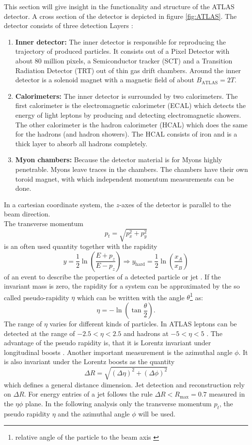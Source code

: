 \documentclass[11pt,a4paper,notitlepage]{scrartcl}
\begin{document}
This section will give insight in the functionality and structure of the ATLAS detector. A cross section of the detector is depicted in figure \ref{fig:ATLAS}. The detector consists of three detection Layers \cite{manual}:
\begin{enumerate}
	\item \textbf{Inner detector:} The inner detector is responsible for reproducing the trajectory of produced particles. It consists out of a Pixel Detector with about 80 million pixels, a Semiconductor tracker (SCT) and a Transition Radiation Detector (TRT) out of thin gas drift chambers. Around the inner detector is a solenoid magnet with a magnetic field of about $B_{\text{ATLAS}}=2T$.  
	\item \textbf{Calorimeters:} The inner detector is surrounded by two calorimeters. The first calorimeter is the electromagnetic calorimeter (ECAL) which detects the energy of light leptons by producing and detecting electromagnetic showers. The other calorimeter is the hadron calorimeter (HCAL) which does the same for the hadrons (and hadron showers). The HCAL consists of iron and is a thick layer to absorb all hadrons completely.
	\item \textbf{Myon chambers:} Because the detector material is for Myons highly penetrable. Myons leave traces in the chambers. The chambers have their own toroid magnet, with which independent momentum measurements can be done.
\end{enumerate}
In a cartesian coordinate system, the $z$-axes of the detector is parallel to the beam direction.\\
The transverse momentum 
\begin{equation*}
	p_t=\sqrt{p_x^2+p_y^2}
\end{equation*}
 is an often used quantity together with the rapidity 
$$y=\frac{1}{2}\ln\left({\frac{E+p_z}{E-p_z}}\right)\Rightarrow y_{\text{hard}}=\frac{1}{2}\ln\left({\frac{x_A}{x_B}}\right)$$
of an event to describe the properties of a detected particle or jet \cite{manual}.
If the invariant mass is zero, the rapidity for a system can be approximated by the so called pseudo-rapidity $\eta$ which can be written with the angle $\theta$\footnote{relative angle of the particle to the beam axis \cite{theta}} as:
$$\eta=-\ln\left(\tan\frac{\theta}{2}\right).$$
The range of $\eta$ varies for different kinds of particles. In ATLAS leptons can be detected at the range of $-2.5<\eta<2.5$ and hadrons at $-5<\eta< 5$ \cite{manual}. The advantage of the pseudo rapidity is, that it is  Lorentz invariant under longitudinal boosts \cite{theta}. Another important measurement is the azimuthal angle $\phi$. It is also invariant under the Lorentz boosts as the quantity $$\Delta R=\sqrt{(\Delta \eta)^2+(\Delta \phi)^2}$$ which defines a general distance dimension. Jet detection and reconstruction rely on $\Delta R$. For energy entries of a jet follows the rule $\Delta R<R_{\text{max}}=0.7$ measured in the $\eta \phi$ plane. In the following analysis only the transverse momentum $p_t$, the pseudo rapidity $\eta$ and the azimuthal angle $\phi$ will be used. \cite{manual} 
\end{document}
